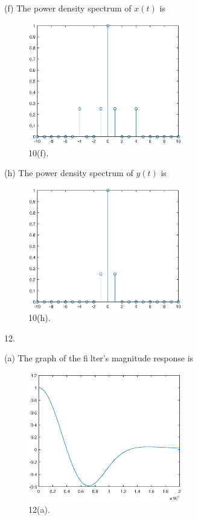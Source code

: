 \documentclass[a4paper]{article}
\begin{document}
(f) The power density spectrum of $x(t)$ is
\begin{figure}[H]
    \begin{center}
        \includegraphics[width=0.6\textwidth]{10(f).eps}
    \end{center}
    \caption{10(f).}
\end{figure}

(h) The power density spectrum of $y(t)$ is
\begin{figure}[H]
    \begin{center}
        \includegraphics[width=0.6\textwidth]{10(h).eps}
    \end{center}
    \caption{10(h).}
\end{figure}

12.

(a) The graph of the filter's magnitude response is
\begin{figure}[H]
    \begin{center}
        \includegraphics[width=0.6\textwidth]{12(a).eps}
    \end{center}
    \caption{12(a).}
\end{figure}
\end{document}
